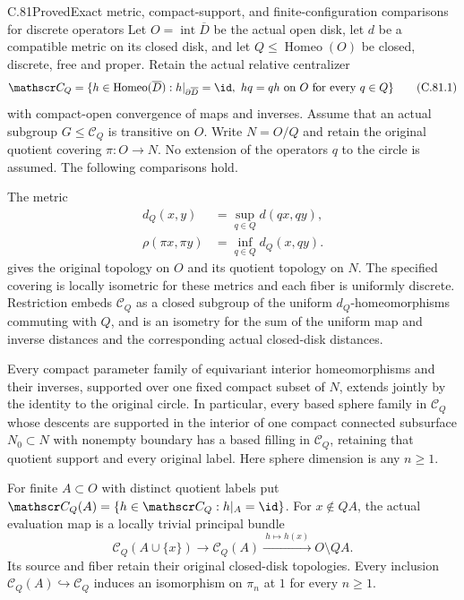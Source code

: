 \begin{claim}{C.81}{Proved}{Exact metric, compact-support, and finite-configuration comparisons for discrete operators}
Let $O=\operatorname{int}\overline D$ be the actual
open disk, let $d$ be a compatible metric on its
closed disk, and let $Q\leq\operatorname{Homeo}(O)$
be closed, discrete, free and proper. Retain the
actual relative centralizer
\[
 \mathscr C_Q=
 \{h\in\operatorname{Homeo}(\overline D):
 h|_{\partial\overline D}=\id,
 \ hq=qh\text{ on }O\text{ for every }q\in Q\}
                                                               \tag{C.81.1}
\]
with compact-open convergence of maps and inverses.
Assume that an actual subgroup $G\leq\mathscr C_Q$
is transitive on $O$. Write $N=O/Q$ and retain
the original quotient covering $\pi:O\to N$.
No extension of the operators $q$ to the circle
is assumed. The following comparisons hold.

The metric
\[
 \begin{split}
 d_Q(x,y)&=\sup_{q\in Q}d(qx,qy),\\
 \rho(\pi x,\pi y)&=\inf_{q\in Q}d_Q(x,qy).
 \end{split}
                                                               \tag{C.81.2}
\]
gives the original topology on $O$ and its
quotient topology on $N$. The specified covering
is locally isometric for these metrics and each
fiber is uniformly discrete. Restriction embeds
$\mathscr C_Q$ as a closed subgroup of the uniform
$d_Q$-homeomorphisms commuting with $Q$, and is
an isometry for the sum of the uniform map and
inverse distances and the corresponding actual
closed-disk distances.

Every compact parameter family of equivariant
interior homeomorphisms and their inverses,
supported over one fixed compact subset of $N$,
extends jointly by the identity to the original
circle. In particular, every based sphere family
in $\mathscr C_Q$ whose descents are supported
in the interior of one compact connected
subsurface $N_0\subset N$ with nonempty boundary
has a based filling in $\mathscr C_Q$, retaining
that quotient support and every original label.
Here sphere dimension is any $n\geq1$.

For finite $A\subset O$ with distinct quotient
labels put
$\mathscr C_Q(A)=\{h\in\mathscr C_Q:h|_A=\id\}$.
For $x\notin QA$, the actual evaluation map is
a locally trivial principal bundle
\[
 \mathscr C_Q(A\cup\{x\})\longrightarrow
 \mathscr C_Q(A)\xrightarrow{\ h\mapsto h(x)\ }O\setminus QA.
                                                               \tag{C.81.3}
\]
Its source and fiber retain their original
closed-disk topologies. Every inclusion
$\mathscr C_Q(A)\hookrightarrow\mathscr C_Q$
induces an isomorphism on $\pi_n$ at $1$ for
every $n\geq1$.


\end{claim}
